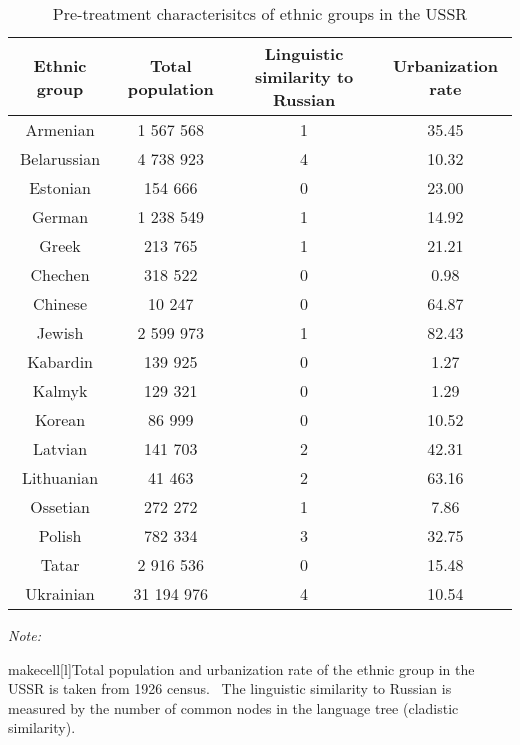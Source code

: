 \begin{table}[t]

\caption{\label{tab:}Pre-treatment characterisitcs of ethnic groups in the USSR}
\centering
\begin{threeparttable}
\begin{tabular}{cccc}
\toprule
Ethnic group & Total population & Linguistic similarity to Russian & Urbanization rate\\
\midrule
Armenian & 1 567 568 & 1 & 35.45\\
Belarussian & 4 738 923 & 4 & 10.32\\
Estonian & 154 666 & 0 & 23.00\\
German & 1 238 549 & 1 & 14.92\\
Greek & 213 765 & 1 & 21.21\\
Chechen & 318 522 & 0 & 0.98\\
Chinese & 10 247 & 0 & 64.87\\
Jewish & 2 599 973 & 1 & 82.43\\
Kabardin & 139 925 & 0 & 1.27\\
Kalmyk & 129 321 & 0 & 1.29\\
Korean & 86 999 & 0 & 10.52\\
Latvian & 141 703 & 2 & 42.31\\
Lithuanian & 41 463 & 2 & 63.16\\
Ossetian & 272 272 & 1 & 7.86\\
Polish & 782 334 & 3 & 32.75\\
Tatar & 2 916 536 & 0 & 15.48\\
Ukrainian & 31 194 976 & 4 & 10.54\\
\bottomrule
\end{tabular}
\begin{tablenotes}
\item \textit{Note: } 
\item makecell[l]{Total population and urbanization rate of the ethnic group in the USSR is taken from 1926 census. \           The linguistic similarity to Russian is measured by the number of common nodes in the language tree (cladistic similarity).}
\end{tablenotes}
\end{threeparttable}
\end{table}